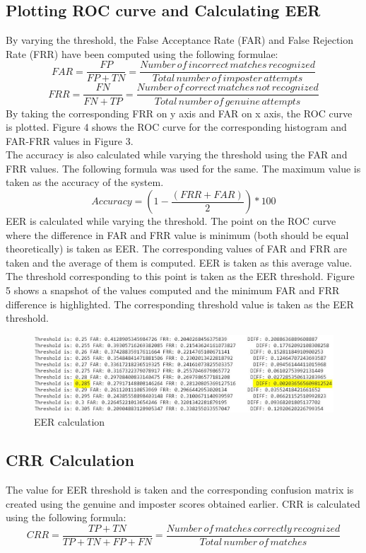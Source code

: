 \documentclass{article}
\begin{document}
\subsection{Plotting ROC curve and Calculating EER}
By varying the threshold, the False Acceptance Rate (FAR) and False Rejection Rate (FRR) have been computed using the following formulae:
\begin{equation}
FAR = \dfrac{FP}{FP+TN} = \dfrac{Number\,of\,incorrect\,matches\,recognized}{Total\,number\,of\,imposter\,attempts}
\end{equation}
\begin{equation}
FRR = \dfrac{FN}{FN+TP} = \dfrac{Number\,of\,correct\,matches\,not\,recognized}{Total\,number\,of\,genuine\,attempts}
\end{equation}
By taking the corresponding FRR on y axis and FAR on x axis, the ROC curve is plotted. Figure 4 shows the ROC curve for the corresponding histogram and FAR-FRR values in Figure 3.\\
The accuracy is also calculated while varying the threshold using the FAR and FRR values. The following formula was used for the same. The maximum value is taken as the accuracy of the system.
\begin{equation}
Accuracy = (1-\dfrac{(FRR+FAR)}{2}) * 100
\end{equation}
EER is calculated while varying the threshold. The point on the ROC curve where the difference in FAR and FRR value is minimum (both should be equal theoretically) is taken as EER. The corresponding values of FAR and FRR are taken and the average of them is computed. EER is taken as this average value. The threshold corresponding to this point is taken as the EER threshold. Figure 5 shows a snapshot of the values computed and the minimum FAR and FRR difference is highlighted. The corresponding threshold value is taken as the EER threshold.
\begin{figure}
  \centering
   \includegraphics[scale=0.8]{./imgs/eer.jpg}
   \caption{EER calculation}
   \label{fig:architecture}
\end{figure}

\subsection{CRR Calculation}
The value for EER threshold is taken and the corresponding confusion matrix is created using the genuine and imposter scores obtained earlier. CRR is calculated using the following formula:
\begin{equation}
CRR = \dfrac{TP+TN}{TP+TN+FP+FN} = \dfrac{Number\,of\,matches\,correctly\,recognized}{Total\,number\,of\,matches}
\end{equation}
\end{document}
